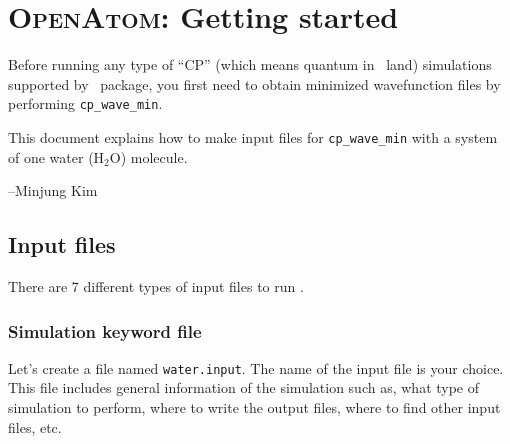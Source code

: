 %
%
%
%
%
%
%
%

\section{\textsc{OpenAtom}: Getting started}

Before running any type of ``CP'' (which means quantum in \openatom \ land) simulations supported by \openatom \ package, you first need to obtain minimized wavefunction files by performing \verb+cp_wave_min+.

This document explains how to make input files for \verb+cp_wave_min+ with a system of one water (H$_2$O) molecule.


--Minjung Kim



\subsection{Input files}

There are 7 different types of input files to run \openatom. 

\subsubsection{Simulation keyword file}

Let's create a file named \verb+water.input+. The name of the input file is your choice. This file includes general information of the simulation such as, what  type of simulation to perform, where to write the output files, where to find other input files, etc. 

